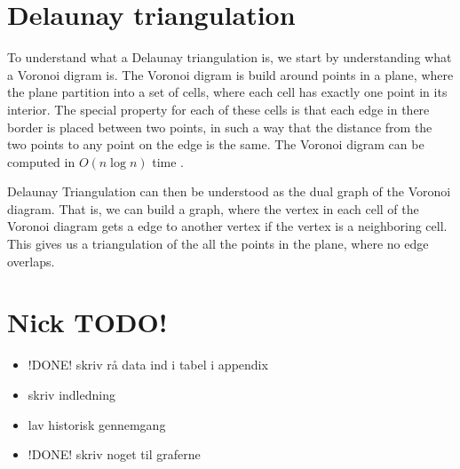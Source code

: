 \chapter{Delaunay triangulation}\label{appendix:delaunaykruskal}

To understand what a Delaunay triangulation is, we start by understanding what a 
Voronoi digram is. The Voronoi digram is build around points in a plane, where 
the plane partition into a set of cells, where each cell has exactly one point 
in its interior. The special property for each of these cells is that each edge 
in there border is placed between two points, in such a way that the distance 
from the two points to any point on the edge is the same. The Voronoi digram can 
be computed in $O(n \log n)$ time \cite{CompGeo}. 

Delaunay Triangulation can then be understood as the dual graph of the Voronoi 
diagram. That is, we can build a graph, where the vertex in each cell of the 
Voronoi diagram gets a edge to another vertex if the vertex is a neighboring 
cell. This gives us a triangulation of the all the points in the plane, where
no edge overlaps.


\chapter{Nick TODO!}
\begin{itemize}
	\item !DONE! skriv rå data ind i tabel i appendix
	\item skriv indledning
	\item lav historisk gennemgang
	\item !DONE! skriv noget til graferne
\end{itemize}
